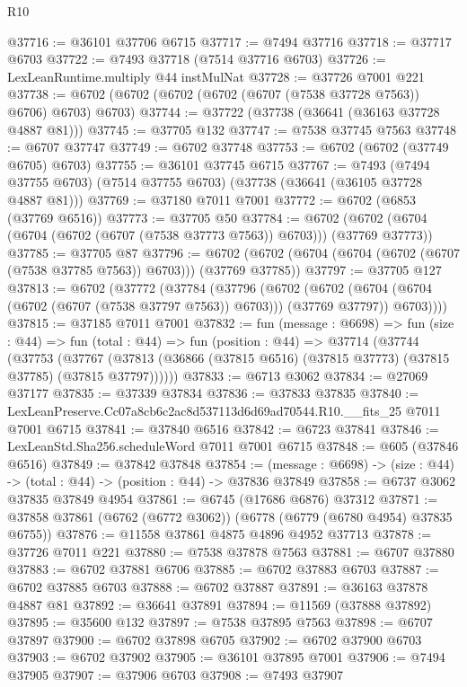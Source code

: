 \begin{lexlean}{R10}
\begin{coremodule}
@37716 := @36101 @37706 @6715
@37717 := @7494 @37716
@37718 := @37717 @6703
@37722 := @7493 @37718 (@7514 @37716 @6703)
@37726 := LexLeanRuntime.multiply @44 instMulNat
@37728 := @37726 @7001 @221
@37738 := @6702 (@6702 (@6702 (@6702 (@6707 (@7538 @37728 @7563)) @6706) @6703) @6703)
@37744 := @37722 (@37738 (@36641 (@36163 @37728 @4887 @81)))
@37745 := @37705 @132
@37747 := @7538 @37745 @7563
@37748 := @6707 @37747
@37749 := @6702 @37748
@37753 := @6702 (@6702 (@37749 @6705) @6703)
@37755 := @36101 @37745 @6715
@37767 := @7493
    (@7494 @37755 @6703)
    (@7514 @37755 @6703)
    (@37738 (@36641 (@36105 @37728 @4887 @81)))
@37769 := @37180 @7011 @7001
@37772 := @6702 (@6853 (@37769 @6516))
@37773 := @37705 @50
@37784 := @6702 (@6702 (@6704 (@6704 (@6702 (@6707 (@7538 @37773 @7563)) @6703))) (@37769 @37773))
@37785 := @37705 @87
@37796 := @6702 (@6702 (@6704 (@6704 (@6702 (@6707 (@7538 @37785 @7563)) @6703))) (@37769 @37785))
@37797 := @37705 @127
@37813 := @6702
    (@37772
      (@37784
        (@37796
          (@6702
            (@6702 (@6704 (@6704 (@6702 (@6707 (@7538 @37797 @7563)) @6703))) (@37769 @37797))
            @6703))))
@37815 := @37185 @7011 @7001
@37832 := fun (message : @6698) =>
  fun (size : @44) =>
  fun (total : @44) =>
  fun (position : @44) =>
  @37714
    (@37744
      (@37753
        (@37767 (@37813 (@36866 (@37815 @6516) (@37815 @37773) (@37815 @37785) (@37815 @37797))))))
@37833 := @6713 @3062
@37834 := @27069 @37177
@37835 := @37339 @37834
@37836 := @37833 @37835
@37840 := LexLeanPreserve.Cc07a8cb6c2ac8d537113d6d69ad70544.R10.__fits_25 @7011 @7001 @6715
@37841 := @37840 @6516
@37842 := @6723 @37841
@37846 := LexLeanStd.Sha256.scheduleWord @7011 @7001 @6715
@37848 := @605 (@37846 @6516)
@37849 := @37842 @37848
@37854 := (message : @6698) -> (size : @44) -> (total : @44) -> (position : @44) -> @37836 @37849
@37858 := @6737 @3062 @37835 @37849 @4954
@37861 := @6745 (@17686 @6876) @37312
@37871 := @37858 @37861 (@6762 (@6772 @3062)) (@6778 (@6779 (@6780 @4954) @37835 @6755))
@37876 := @11558 @37861 @4875 @4896 @4952 @37713
@37878 := @37726 @7011 @221
@37880 := @7538 @37878 @7563
@37881 := @6707 @37880
@37883 := @6702 @37881 @6706
@37885 := @6702 @37883 @6703
@37887 := @6702 @37885 @6703
@37888 := @6702 @37887
@37891 := @36163 @37878 @4887 @81
@37892 := @36641 @37891
@37894 := @11569 (@37888 @37892)
@37895 := @35600 @132
@37897 := @7538 @37895 @7563
@37898 := @6707 @37897
@37900 := @6702 @37898 @6705
@37902 := @6702 @37900 @6703
@37903 := @6702 @37902
@37905 := @36101 @37895 @7001
@37906 := @7494 @37905
@37907 := @37906 @6703
@37908 := @7493 @37907

\end{coremodule}
\end{lexlean}
